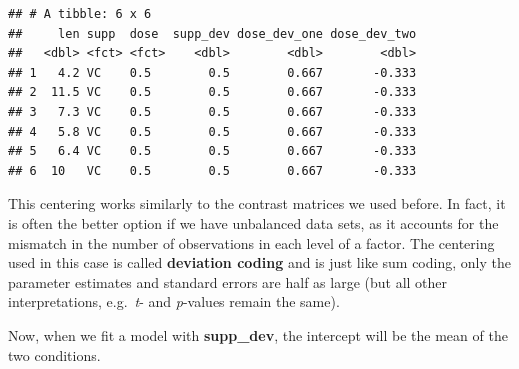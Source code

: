 \documentclass[
]{book}
\newenvironment{Shaded}{\begin{snugshade}}{\end{snugshade}}
\newcommand{\CommentTok}[1]{\textcolor[rgb]{0.56,0.35,0.01}{\textit{#1}}}
\newcommand{\FunctionTok}[1]{\textcolor[rgb]{0.00,0.00,0.00}{#1}}
\newcommand{\NormalTok}[1]{#1}
\newcommand{\OtherTok}[1]{\textcolor[rgb]{0.56,0.35,0.01}{#1}}
\newcommand{\SpecialCharTok}[1]{\textcolor[rgb]{0.00,0.00,0.00}{#1}}
\newcommand{\StringTok}[1]{\textcolor[rgb]{0.31,0.60,0.02}{#1}}
\begin{document}
\begin{Shaded}
\end{Shaded}

\begin{verbatim}
## # A tibble: 6 x 6
##     len supp  dose  supp_dev dose_dev_one dose_dev_two
##   <dbl> <fct> <fct>    <dbl>        <dbl>        <dbl>
## 1   4.2 VC    0.5        0.5        0.667       -0.333
## 2  11.5 VC    0.5        0.5        0.667       -0.333
## 3   7.3 VC    0.5        0.5        0.667       -0.333
## 4   5.8 VC    0.5        0.5        0.667       -0.333
## 5   6.4 VC    0.5        0.5        0.667       -0.333
## 6  10   VC    0.5        0.5        0.667       -0.333
\end{verbatim}

This centering works similarly to the contrast matrices we used before. In fact, it is often the better option if we have unbalanced data sets, as it accounts for the mismatch in the number of observations in each level of a factor. The centering used in this case is called \textbf{deviation coding} and is just like sum coding, only the parameter estimates and standard errors are half as large (but all other interpretations, e.g.~\emph{t}- and \emph{p}-values remain the same).

Now, when we fit a model with \textbf{supp\_dev}, the intercept will be the mean of the two conditions.
\end{document}
